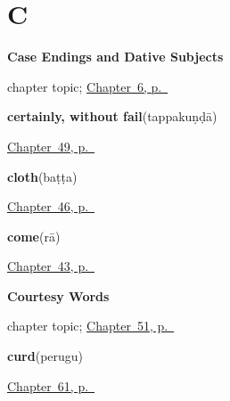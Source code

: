 \section*{C}

\noindent\begin{minipage}[t]{\linewidth}
\raggedright
\textbf{Case Endings and Dative Subjects}\par
\footnotesize chapter topic; \hyperref[ch:te-dative-case]{Chapter~6, p.~\pageref*{ch:te-dative-case}}
\end{minipage}\par\smallskip

\noindent\begin{minipage}[t]{\linewidth}
\raggedright
\textbf{certainly, without fail}\enspace\emph{}\enspace(tappakuṇḍā)\par
\footnotesize \hyperref[ch:te-replies]{Chapter~49, p.~\pageref*{ch:te-replies}}
\end{minipage}\par\smallskip

\noindent\begin{minipage}[t]{\linewidth}
\raggedright
\textbf{cloth}\enspace\emph{}\enspace(baṭṭa)\par
\footnotesize \hyperref[ch:te-ask-for]{Chapter~46, p.~\pageref*{ch:te-ask-for}}
\end{minipage}\par\smallskip

\noindent\begin{minipage}[t]{\linewidth}
\raggedright
\textbf{come}\enspace\emph{}\enspace(rā)\par
\footnotesize \hyperref[ch:te-more-verbs]{Chapter~43, p.~\pageref*{ch:te-more-verbs}}
\end{minipage}\par\smallskip

\noindent\begin{minipage}[t]{\linewidth}
\raggedright
\textbf{Courtesy Words}\par
\footnotesize chapter topic; \hyperref[ch:te-courtesy]{Chapter~51, p.~\pageref*{ch:te-courtesy}}
\end{minipage}\par\smallskip

\noindent\begin{minipage}[t]{\linewidth}
\raggedright
\textbf{curd}\enspace\emph{}\enspace(perugu)\par
\footnotesize \hyperref[ch:te-kitchen]{Chapter~61, p.~\pageref*{ch:te-kitchen}}
\end{minipage}\par\smallskip

